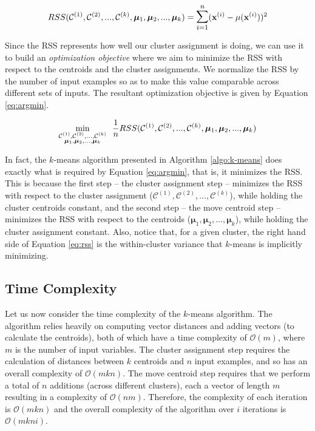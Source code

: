 \begin{equation}
    RSS(\mathcal{C}^{(1)}, \mathcal{C}^{(2)}, ..., \mathcal{C}^{(k)}, \bm{\mu}_1, \bm{\mu}_2, ..., \bm{\mu}_k) = \mathlarger{\mathlarger{\sum}}_{i = 1}^{n} ( \mathbf{x}^{(i)} - \mu(\mathbf{x}^{(i)}) )^2
    \label{eq:rss}
\end{equation}

Since the RSS represents how well our cluster assignment is doing, we can use it to build an \emph{optimization objective} where we aim to minimize the RSS with respect to the centroids and the cluster assignments. We normalize the RSS by the number of input examples so as to make this value comparable across different sets of inputs. The resultant optimization objective is given by Equation \ref{eq:argmin}.

\begin{equation}
    \underset{\rm \substack{ \mathcal{C}^{(1)}, \mathcal{C}^{(2)}, ..., \mathcal{C}^{(k)} \\ \bm{\mu}_1, \bm{\mu}_2, ..., \bm{\mu}_k }}{\rm \text{min}}~~\frac{1}{n} RSS(\mathcal{C}^{(1)}, \mathcal{C}^{(2)}, ..., \mathcal{C}^{(k)}, \bm{\mu}_1, \bm{\mu}_2, ..., \bm{\mu}_k)
    \label{eq:argmin}
\end{equation}

In fact, the $k$-means algorithm presented in Algorithm \ref{algo:k-means} does exactly what is required by Equation \ref{eq:argmin}, that is, it minimizes the RSS. This is because the first step -- the cluster assignment step -- minimizes the RSS with respect to the cluster assignment ($\mathcal{C}^{(1)}, \mathcal{C}^{(2)}, ..., \mathcal{C}^{(k)}$), while holding the cluster centroids constant, and the second step -- the move centroid step -- minimizes the RSS with respect to the centroids ($\bm{\mu}_1, \bm{\mu}_2, ..., \bm{\mu}_k$), while holding the cluster assignment constant. Also, notice that, for a given cluster, the right hand side of Equation \ref{eq:rss} is the within-cluster variance that $k$-means is implicitly minimizing.  

\subsection{Time Complexity}
\label{sec:complexity}
Let us now consider the time complexity of the $k$-means algorithm. The algorithm relies heavily on computing vector distances and adding vectors (to calculate the centroids), both of which have a time complexity of $\mathcal{O}(m)$, where $m$ is the number of input variables. The cluster assignment step requires the calculation of distances between $k$ centroids and $n$ input examples, and so has an overall complexity of $\mathcal{O}(mkn)$. The move centroid step requires that we perform a total of $n$ additions (across different clusters), each a vector of length $m$ resulting in a complexity of $\mathcal{O}(nm)$. Therefore, the complexity of each iteration is $\mathcal{O}(mkn)$ and the overall complexity of the algorithm over $i$ iterations is $\mathcal{O}(mkni)$. 

